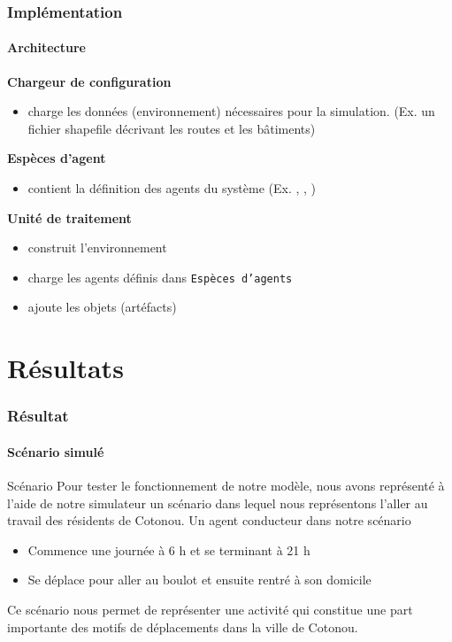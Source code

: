 \begin{frame}
    \frametitle{Implémentation}
    \framesubtitle{Architecture}
    \textbf{Chargeur de configuration}
    \begin{itemize}
        \item charge les données (environnement) nécessaires pour la simulation. (Ex. un fichier shapefile décrivant les routes et les bâtiments)

    \end{itemize}

    \textbf{Espèces d'agent}
    \begin{itemize}
        \item contient la définition des agents du système (Ex. \aTMoto{}, \aTBus{}, \aPolicier{})
    \end{itemize}

    \textbf{Unité de traitement}
    \begin{itemize}
        \item construit l'environnement
        \item charge les agents définis dans \texttt{Espèces d'agents}
        \item ajoute les objets (artéfacts)
    \end{itemize}

\end{frame}


\section{Résultats}\label{results}
\begin{frame}
    \frametitle{Résultat}
    \framesubtitle{Scénario simulé}

    \begin{block}{Scénario}
        Pour tester le fonctionnement de notre modèle, nous avons représenté à l'aide de notre simulateur un scénario dans lequel nous représentons l'aller au travail des résidents de Cotonou.
        Un agent conducteur dans notre scénario
        \begin{itemize}
            \item Commence une journée à 6 h et se terminant à 21 h
            \item Se déplace pour aller au boulot et ensuite rentré à son domicile
        \end{itemize}
        Ce scénario nous permet de représenter une activité qui constitue une part importante des motifs de déplacements dans la ville de Cotonou.
    \end{block}
\end{frame}

